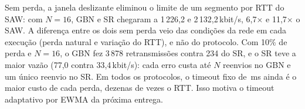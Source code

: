 Sem perda, a janela deslizante eliminou o limite de um segmento por RTT do SAW: com $N=16$, GBN e SR chegaram a 1\,226,2 e 2\,132,2\,kbit/s, 6,7$\times$ e 11,7$\times$ o SAW. A diferença entre os dois sem perda veio das condições da rede em cada execução (perda natural e variação do RTT), e não do protocolo. Com 10\% de perda e $N=16$, o GBN fez 3\,878 retransmissões contra 234 do SR, e o SR teve a maior vazão (77,0 contra 33,4\,kbit/s): cada erro custa até $N$ reenvios no GBN e um único reenvio no SR. Em todos os protocolos, o timeout fixo de \eTimeout\,ms ainda é o maior custo de cada perda, dezenas de vezes o RTT. Isso motiva o timeout adaptativo por EWMA da próxima entrega.
